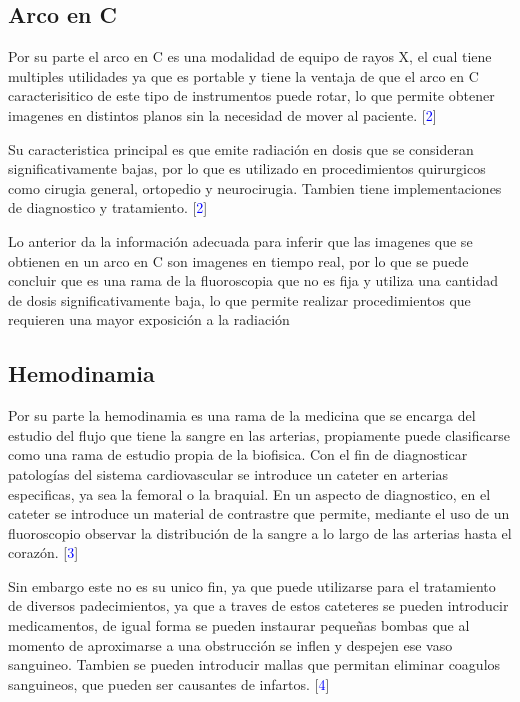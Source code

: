 \documentclass{article}
\begin{document}
\subsection{Arco en C}

Por su parte el arco en C es una modalidad de equipo de rayos X, el cual tiene multiples utilidades ya que es portable y tiene la ventaja de que el arco en C caracterisitico de este tipo de instrumentos puede rotar, lo que permite obtener imagenes en distintos planos sin la necesidad de mover al paciente. [\textcolor{blue}{2}]
\vspace{10pt}

Su caracteristica principal es que emite radiación en dosis que se consideran significativamente bajas, por lo que es utilizado en procedimientos quirurgicos como cirugia general, ortopedio y neurocirugia. Tambien tiene implementaciones de diagnostico y tratamiento. [\textcolor{blue}{2}]

\vspace{10pt}

Lo anterior da la información adecuada para inferir que las imagenes que se obtienen en un arco en C son imagenes en tiempo real, por lo que se puede concluir que es una rama de la fluoroscopia que no es fija y utiliza una cantidad de dosis significativamente baja, lo que permite realizar procedimientos que requieren una mayor exposición a la radiación 



\subsection{Hemodinamia}


Por su parte la hemodinamia es una rama de la medicina que se encarga del estudio del flujo que tiene la sangre en las arterias, propiamente puede clasificarse como una rama de estudio propia de la biofisica. Con el fin de diagnosticar patologías del sistema cardiovascular se introduce un cateter en arterias especificas, ya sea la femoral o la braquial. En un aspecto de diagnostico, en el cateter se introduce un material de contrastre que permite, mediante el uso de un fluoroscopio observar la distribución de la sangre a lo largo de las arterias hasta el corazón. [\textcolor{blue}{3}]

\vspace{10pt}


Sin embargo este no es su unico fin, ya que puede utilizarse para el tratamiento de diversos padecimientos, ya que a traves de estos cateteres se pueden introducir medicamentos, de igual forma se pueden instaurar pequeñas bombas que al momento de aproximarse a una obstrucción se inflen y despejen ese vaso sanguineo. Tambien se pueden introducir mallas que permitan eliminar coagulos sanguineos, que pueden ser causantes de infartos. [\textcolor{blue}{4}]
\end{document}
